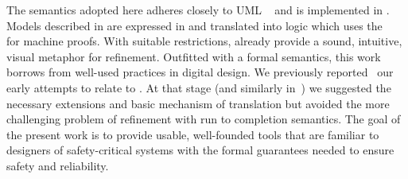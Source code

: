 The semantics adopted here adheres closely to UML \Statecharts~\cite{Alexandre} and is implemented in \iUMLB.
Models described in \Statecharts are expressed in \SCXML and translated into \EventB logic which uses the \Rodin~\cite{abrial10:_rodin} for machine proofs.
With suitable restrictions, \Statecharts already provide a sound, intuitive, visual metaphor for refinement. 
Outfitted with a formal semantics, this work borrows from well-used \Statechart practices in digital design.  
We previously reported~\cite{Morris_2016} our early attempts to relate \Statecharts to \EventB. 
At that stage (and similarly in\mbox{~\cite{Snook12:FMCO}}) we suggested the necessary extensions and basic mechanism of translation but avoided the more challenging problem of refinement with run to completion semantics. 
The goal of the present work is to provide usable, well-founded tools that are familiar to designers of safety-critical systems with the formal guarantees needed to ensure safety and reliability.





